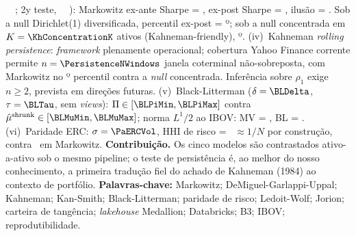 \documentclass[12pt,a4paper,oneside]{article}
\begin{document}
\begin{singlespace}
\KhTrainStart\ \textendash\ \KhTrainEnd; 2y teste,
\KhTestStart\ \textendash\ \KhTestEnd): Markowitz ex-ante
Sharpe = \KhMVExAnte, ex-post Sharpe = \KhMVExPost, ilusão = \KhIllusion.
Sob a null Dirichlet(1) diversificada, percentil ex-post = \KhDirichletExPostPct º;
sob a null concentrada em $K=\KhConcentrationK$ ativos
(Kahneman-friendly), \KhConcentratedExPostPct º.
(iv)~Kahneman \textit{rolling persistence}: \textit{framework}
plenamente operacional; cobertura Yahoo Finance corrente permite
$n = \PersistenceNWindows$ janela coterminal não-sobreposta, com
Markowitz no \PersistenceMeanPercentile º percentil contra a
\textit{null} concentrada. Inferência sobre $\hat{\rho}_1$ exige
$n \geq 2$, prevista em direções futuras.
(v)~Black-Litterman ($\delta = \BLDelta$, $\tau = \BLTau$, sem
\textit{views}): $\Pi \in [\BLPiMin, \BLPiMax]$ contra $\hat{\mu}^{\text{shrunk}}
\in [\BLMuMin, \BLMuMax]$; norma $L^1/2$ ao IBOV: MV = \BLLOneMv,
BL = \BLLOneBl.
(vi)~Paridade ERC: $\sigma = \PaERCVol$, HHI de risco = \PaERCHHI\
$\approx 1/N$ por construção, contra \PaMarkowitzHHI\ em Markowitz.
\textbf{Contribuição.} Os cinco modelos são contrastados ativo-a-ativo
sob o mesmo pipeline; o teste de persistência é, ao melhor do
nosso conhecimento, a primeira tradução fiel do achado de Kahneman
(1984) ao contexto de portfólio.
\vspace{0.4cm}\noindent\textbf{Palavras-chave:} Markowitz; DeMiguel-Garlappi-Uppal;
Kahneman; Kan-Smith; Black-Litterman; paridade de risco; Ledoit-Wolf;
Jorion; carteira de tangência; \textit{lakehouse} Medallion;
Databricks; B3; IBOV; reprodutibilidade.
\end{singlespace}
\end{document}
